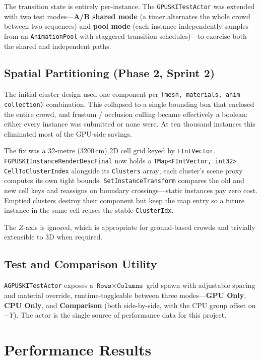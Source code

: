 \documentclass[11pt, a4paper]{article}
\begin{document}
The transition state is entirely per-instance. The \texttt{GPUSKITestActor} was extended with two test modes---\textbf{A/B shared mode} (a timer alternates the whole crowd between two sequences) and \textbf{pool mode} (each instance independently samples from an \texttt{AnimationPool} with staggered transition schedules)---to exercise both the shared and independent paths.

\subsection{Spatial Partitioning (Phase 2, Sprint 2)}
\label{sec:spatial}

The initial cluster design used one component per \texttt{(mesh, materials, anim collection)} combination. This collapsed to a single bounding box that enclosed the entire crowd, and frustum / occlusion culling became effectively a boolean: either every instance was submitted or none were. At ten thousand instances this eliminated most of the GPU-side savings.

The fix was a 32-metre (3200\,cm) 2D cell grid keyed by \texttt{FIntVector}. \texttt{FGPUSKIInstanceRenderDescFinal} now holds a \texttt{TMap<FIntVector, int32> CellToClusterIndex} alongside its \texttt{Clusters} array; each cluster's scene proxy computes its own tight bounds. \texttt{SetInstanceTransform} compares the old and new cell keys and reassigns on boundary crossings---static instances pay zero cost. Emptied clusters destroy their component but keep the map entry so a future instance in the same cell reuses the stable \texttt{ClusterIdx}.

The $Z$-axis is ignored, which is appropriate for ground-based crowds and trivially extensible to 3D when required.

\subsection{Test and Comparison Utility}

\texttt{AGPUSKITestActor} exposes a $\texttt{Rows} \times \texttt{Columns}$ grid spawn with adjustable spacing and material override, runtime-toggleable between three modes---\textbf{GPU Only}, \textbf{CPU Only}, and \textbf{Comparison} (both side-by-side, with the CPU group offset on $-Y$). The actor is the single source of performance data for this project.

\section{Performance Results}
\end{document}
